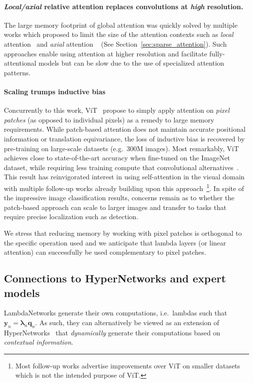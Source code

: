 \documentclass{article} \usepackage{iclr2021_conference,times}
\begin{document}
\paragraph{\emph{Local/axial} relative attention replaces convolutions at \emph{high} resolution.}
The large memory footprint of global attention was quickly solved by multiple works which proposed to limit the size of the attention contexts such as \emph{local} attention~\citep{ramachandran2019sasa,hu2019local} and \emph{axial} attention ~\citep{ho2019axial,wang2020axialdeeplab,shen2020global} (See Section~\ref{sec:sparse_attention}).
Such approaches enable using attention at higher resolution and facilitate fully-attentional models but can be slow due to the use of specialized attention patterns.

\paragraph{Scaling trumps inductive bias}
Concurrently to this work, ViT~\citep{dosovitskiy2020image} propose to simply apply attention on \emph{pixel patches} (as opposed to individual pixels) as a remedy to large memory requirements.
While patch-based attention does not maintain accurate positional information or translation equivariance, the loss of inductive bias is recovered by pre-training on large-scale datasets (e.g.\ 300M images).
Most remarkably, ViT achieves close to state-of-the-art accuracy when fine-tuned on the ImageNet dataset, while requiring less training compute that convolutional alternatives~\citep{kolesnikov2020big,xie2020selftraining}.
This result has reinvigorated interest in using self-attention in the visual domain with multiple follow-up works already building upon this approach~\citep{touvron2021training}\footnote{Most follow-up works advertise improvements over ViT on smaller datasets which is not the intended purpose of ViT.}.
In spite of the impressive image classification results, concerns remain as to whether the patch-based approach can scale to larger images and transfer to tasks that require precise localization such as detection.

We stress that reducing memory by working with pixel patches is orthogonal to the specific operation used
and we anticipate that lambda layers (or linear attention) can successfully be used complementary to pixel patches.

\vspace{-0.1cm}
\subsection{Connections to HyperNetworks and expert models}
LambdaNetworks generate their own computations, i.e.\ lambdas such that $\boldsymbol{y}_n=\boldsymbol{\lambda}_n \boldsymbol{q}_n$.
As such, they can alternatively be viewed as an extension of HyperNetworks~\citep{ha2016hypernetworks} that \emph{dynamically} generate their computations based on \emph{contextual information}.
\end{document}
